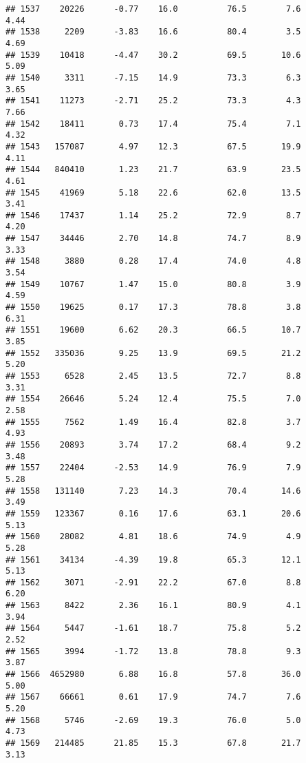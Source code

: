 \documentclass[
]{article}
\begin{document}
\begin{verbatim}
## 1537    20226      -0.77    16.0          76.5        7.6              4.44
## 1538     2209      -3.83    16.6          80.4        3.5              4.69
## 1539    10418      -4.47    30.2          69.5       10.6              5.09
## 1540     3311      -7.15    14.9          73.3        6.3              3.65
## 1541    11273      -2.71    25.2          73.3        4.3              7.66
## 1542    18411       0.73    17.4          75.4        7.1              4.32
## 1543   157087       4.97    12.3          67.5       19.9              4.11
## 1544   840410       1.23    21.7          63.9       23.5              4.61
## 1545    41969       5.18    22.6          62.0       13.5              3.41
## 1546    17437       1.14    25.2          72.9        8.7              4.20
## 1547    34446       2.70    14.8          74.7        8.9              3.33
## 1548     3880       0.28    17.4          74.0        4.8              3.54
## 1549    10767       1.47    15.0          80.8        3.9              4.59
## 1550    19625       0.17    17.3          78.8        3.8              6.31
## 1551    19600       6.62    20.3          66.5       10.7              3.85
## 1552   335036       9.25    13.9          69.5       21.2              5.20
## 1553     6528       2.45    13.5          72.7        8.8              3.31
## 1554    26646       5.24    12.4          75.5        7.0              2.58
## 1555     7562       1.49    16.4          82.8        3.7              4.93
## 1556    20893       3.74    17.2          68.4        9.2              3.48
## 1557    22404      -2.53    14.9          76.9        7.9              5.28
## 1558   131140       7.23    14.3          70.4       14.6              3.49
## 1559   123367       0.16    17.6          63.1       20.6              5.13
## 1560    28082       4.81    18.6          74.9        4.9              5.28
## 1561    34134      -4.39    19.8          65.3       12.1              5.13
## 1562     3071      -2.91    22.2          67.0        8.8              6.20
## 1563     8422       2.36    16.1          80.9        4.1              3.94
## 1564     5447      -1.61    18.7          75.8        5.2              2.52
## 1565     3994      -1.72    13.8          78.8        9.3              3.87
## 1566  4652980       6.88    16.8          57.8       36.0              5.00
## 1567    66661       0.61    17.9          74.7        7.6              5.20
## 1568     5746      -2.69    19.3          76.0        5.0              4.73
## 1569   214485      21.85    15.3          67.8       21.7              3.13

\end{verbatim}
\end{document}
